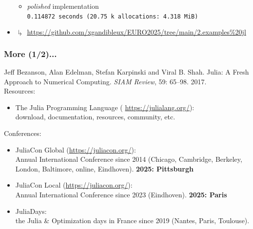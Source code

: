 \documentclass[]{beamer}
\newcommand*{\blue}[1]{\textcolor{nblue}{#1}}
\begin{document}
\begin{frame}
\begin{itemize}
\begin{itemize}
\item[] \hspace{-7.85mm} \textit{polished} implementation \\
{\scriptsize
\hspace{-7.5mm}\texttt{0.114872 seconds (20.75 k allocations: 4.318 MiB)} %
}
\end{itemize}
\vspace{3mm}
\item[] \hspace{-3.5mm}$\drsh$ \tiny{\url{https://github.com/xgandibleux/EURO2025/tree/main/2.examples\%20jl}}

\end{itemize}



\end{frame}

% 
%

\begin{frame}
  \frametitle{More (1/2)...}
\vspace{3mm}

{\footnotesize

Jeff Bezanson, Alan Edelman, Stefan Karpinski and Viral B. Shah.
Julia: A Fresh Approach to Numerical Computing. 
\textit{SIAM Review}, 59: 65--98. 2017.\vspace{5mm}\\

Resources:\\
\begin{itemize}
\item[] \blue{The Julia Programming Language} ( \url{https://julialang.org/}): \\
download, documentation, resources, community, etc. \vspace{4mm}
\end{itemize}

Conferences:\\
\begin{itemize}
\item[] \blue{JuliaCon Global} (\url{https://juliacon.org/}):\\ Annual International Conference since 2014 (Chicago, Cambridge, Berkeley, London, Baltimore, online, Eindhoven). \textbf{2025: Pittsburgh} \vspace{1.5mm}

\item[] \blue{JuliaCon Local} (\url{https://juliacon.org/}):\\ Annual International Conference since 2023 (Eindhoven). \textbf{2025: Paris} \vspace{1.5mm}\\

\item[] \blue{JuliaDays}:\\ the Julia \& Optimization days in France since 2019 (Nantes, Paris, Toulouse).
\end{itemize}

}
\end{frame}
\end{document}
